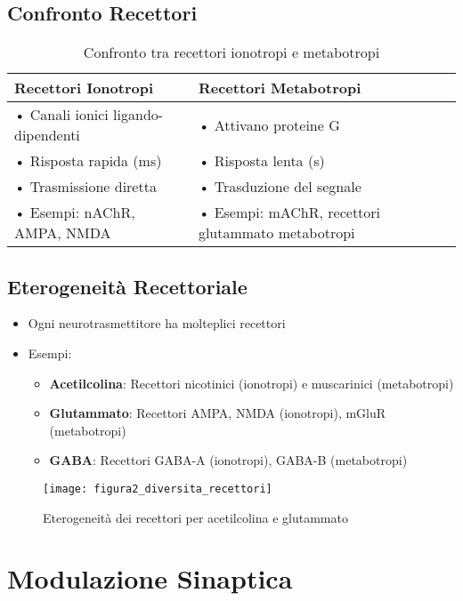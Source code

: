 \documentclass{article}
\begin{document}
\subsection{Confronto Recettori}
\begin{table}[h]
\centering
\caption{Confronto tra recettori ionotropi e metabotropi}
\begin{tabular}{p{5cm}p{5cm}}
\toprule
\textbf{Recettori Ionotropi} & \textbf{Recettori Metabotropi} \\
\midrule
• Canali ionici ligando-dipendenti & • Attivano proteine G \\
• Risposta rapida (ms) & • Risposta lenta (s) \\
• Trasmissione diretta & • Trasduzione del segnale \\
• Esempi: nAChR, AMPA, NMDA & • Esempi: mAChR, recettori glutammato metabotropi \\
\bottomrule
\end{tabular}
\label{tab:recettori}
\end{table}

\subsection{Eterogeneità Recettoriale}
\begin{itemize}
\item Ogni neurotrasmettitore ha molteplici recettori
\item Esempi:
  \begin{itemize}
  \item \textbf{Acetilcolina}: Recettori nicotinici (ionotropi) e muscarinici (metabotropi)
  \item \textbf{Glutammato}: Recettori AMPA, NMDA (ionotropi), mGluR (metabotropi)
  \item \textbf{GABA}: Recettori GABA-A (ionotropi), GABA-B (metabotropi)
  \end{itemize}
\end{itemize}

\begin{figure}[h]
\centering
\texttt{[image: figura2\_diversita\_recettori]}
\caption{Eterogeneità dei recettori per acetilcolina e glutammato}
\label{fig:diversita_recettori}
\end{figure}

\section{Modulazione Sinaptica}
\end{document}
